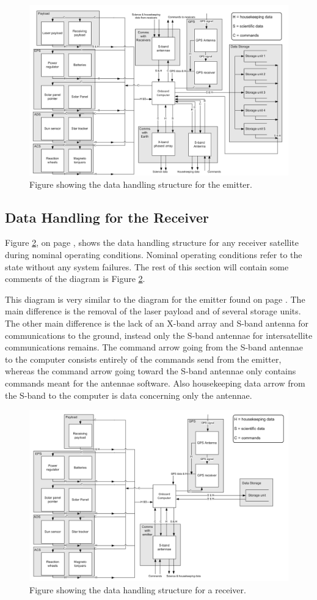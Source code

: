 \begin{figure}
\centering
\includegraphics[width=1.0\textwidth, angle=90]{chapters/img/DHEmitter.png}
\caption{Figure showing the data handling structure for the emitter.}
\label{fig:DHE}
\end{figure}

\subsection{Data Handling for the Receiver}
\label{DataHandlingReceiver}

Figure \ref{fig:DHR}, on page \pageref{fig:DHR}, shows the data handling structure for any receiver satellite during nominal operating conditions. Nominal operating conditions refer to the state without any system failures. The rest of this section will contain some comments of the diagram is Figure \ref{fig:DHR}.

This diagram is very similar to the diagram for the emitter found on page \pageref{fig:DHE}. The main difference is the removal of the laser payload and of several storage units. The other main difference is the lack of an X-band array and S-band antenna for communications to the ground, instead only the S-band antennae for intersatellite communications remains. The command arrow going from the S-band antennae to the computer consists entirely of the commands send from the emitter, whereas the command arrow going toward the S-band antennae only contains commands meant for the antennae software. Also housekeeping data arrow from the S-band to the computer is data concerning only the antennae.

\begin{figure}
\centering
\includegraphics[width=1.0\textwidth, angle=90]{chapters/img/DHReceiver.png}
\caption{Figure showing the data handling structure for a receiver.}
\label{fig:DHR}
\end{figure}